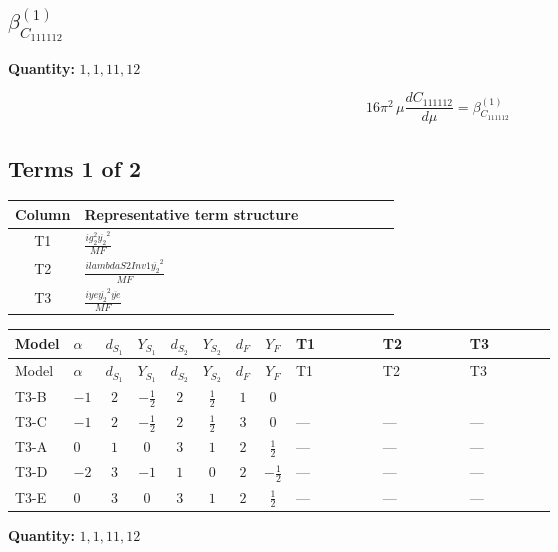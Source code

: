 \documentclass[8pt]{article}
\begin{document}
\begin{landscape}
\section*{$\beta_{C_{111112}}^{(1)}$}
\noindent\textbf{Quantity: }$\mathrm{1,1,11,12}$\par\smallskip
\[16\pi^2\,\mu\frac{d C_{111112}}{d\mu}=\beta_{C_{111112}}^{(1)}\]
\subsection*{Terms 1 of 2}
\begin{center}
\begin{tabular}{@{}c >{\raggedright\arraybackslash}p{0.82\linewidth}@{}}
\toprule
Column & Representative term structure \\
\midrule
T1 & \(\displaystyle \frac{i g_{2}^{2} \overline{y_{2}}^{2}}{MF}\) \\
\midrule
T2 & \(\displaystyle \frac{i lambdaS2Inv1 \overline{y_{2}}^{2}}{MF}\) \\
\midrule
T3 & \(\displaystyle \frac{i ye \overline{y_{2}}^{2} \overline{ye}}{MF}\) \\
\midrule
\bottomrule
\end{tabular}
\end{center}
\smallskip
\tiny
\begin{longtable}{@{}llcccccc >{\raggedright\arraybackslash}p{0.21\linewidth} >{\raggedright\arraybackslash}p{0.21\linewidth} >{\raggedright\arraybackslash}p{0.21\linewidth}@{}}
\toprule
Model & $\alpha$ & $d_{S_1}$ & $Y_{S_1}$ & $d_{S_2}$ & $Y_{S_2}$ & $d_F$ & $Y_F$ & T1 & T2 & T3 \\
\midrule
\endfirsthead
\toprule
Model & $\alpha$ & $d_{S_1}$ & $Y_{S_1}$ & $d_{S_2}$ & $Y_{S_2}$ & $d_F$ & $Y_F$ & T1 & T2 & T3 \\
\midrule
\endhead
T3-B & $-1$ & $2$ & $-\frac{1}{2}$ & $2$ & $\frac{1}{2}$ & $1$ & $0$ & \scriptsize\adjustbox{max width=\linewidth}{$\begin{gathered} - \frac{3 i g_{2}^{2} \overline{y_{2}}^{2}}{4 MF}\end{gathered}$} & \scriptsize\adjustbox{max width=\linewidth}{$\begin{gathered} - \frac{i lambdaS2Inv1 \overline{y_{2}}^{2}}{2 MF}\end{gathered}$} & \scriptsize\adjustbox{max width=\linewidth}{$\begin{gathered} \frac{i ye \overline{y_{2}}^{2} \overline{ye}}{4 MF}\end{gathered}$} \\
\midrule
T3-C & $-1$ & $2$ & $-\frac{1}{2}$ & $2$ & $\frac{1}{2}$ & $3$ & $0$ & --- & --- & --- \\
\midrule
T3-A & $0$ & $1$ & $0$ & $3$ & $1$ & $2$ & $\frac{1}{2}$ & --- & --- & --- \\
\midrule
T3-D & $-2$ & $3$ & $-1$ & $1$ & $0$ & $2$ & $-\frac{1}{2}$ & --- & --- & --- \\
\midrule
T3-E & $0$ & $3$ & $0$ & $3$ & $1$ & $2$ & $\frac{1}{2}$ & --- & --- & --- \\
\midrule
\bottomrule
\end{longtable}
\clearpage
\noindent\textbf{Quantity: }$\mathrm{1,1,11,12}$\par\smallskip

\end{landscape}
\end{document}
